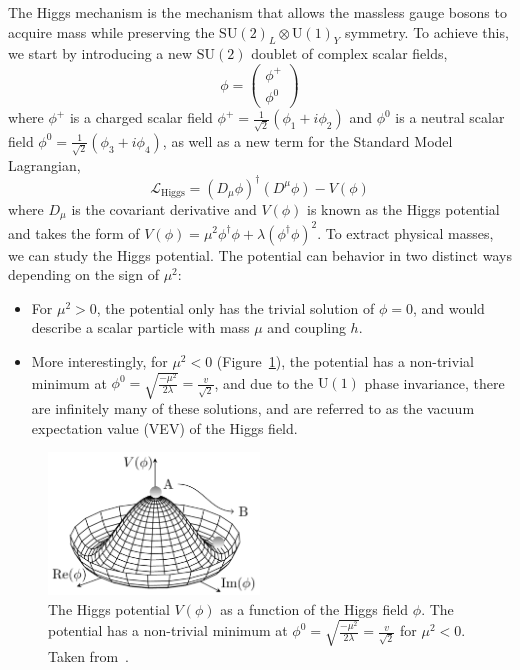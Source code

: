 The Higgs mechanism is the mechanism that allows the massless gauge bosons to acquire mass while preserving the $\mathrm{SU}{(2)}_{L} \otimes \mathrm{U}{(1)}_{Y}$ symmetry. To achieve this, we start by introducing a new $\mathrm{SU}(2)$ doublet of complex scalar fields,
\begin{equation}
  \phi = \begin{pmatrix}
    \phi^{+} \\
    \phi^{0}
  \end{pmatrix}
  \label{eq:higgs_doublet}
\end{equation}
where $\phi^{+}$ is a charged scalar field $\phi^{+} = \frac{1}{\sqrt{2}}(\phi_{1} + i \phi_{2})$ and $\phi^{0}$ is a neutral scalar field $\phi^{0} = \frac{1}{\sqrt{2}}(\phi_{3} + i \phi_{4})$, as well as a new term for the Standard Model Lagrangian,
\begin{equation}
  \mathcal{L}_{\mathrm{Higgs}} = {(D_{\mu}\phi)}^{\dagger}(D^{\mu}\phi) - V(\phi)
  \label{eq:higgs_lagrangian}
\end{equation}
where $D_{\mu}$ is the covariant derivative and $V(\phi)$ is known as the Higgs potential and takes the form of $V(\phi) = \mu^{2}\phi^{\dagger}\phi + \lambda{(\phi^{\dagger}\phi)}^{2}$. To extract physical masses, we can study the Higgs potential. The potential can behavior in two distinct ways depending on the sign of $\mu^{2}$:
\begin{itemize}
  \item For $\mu^{2} > 0$, the potential only has the trivial solution of $\phi = 0$, and would describe a scalar particle with mass $\mu$ and coupling $h$. 
  \item More interestingly, for $\mu^{2} < 0$ (Figure~\ref{fig:theory_higgs_potential}), the potential has a non-trivial minimum at $\phi^{0} = \sqrt{\frac{-\mu^{2}}{2\lambda}} = \frac{v}{\sqrt{2}}$, and due to the $\mathrm{U}(1)$ phase invariance, there are infinitely many of these solutions, and are referred to as the vacuum expectation value (VEV) of the Higgs field.
\end{itemize}

\begin{figure}
  \centering
  \includegraphics[width=0.5\textwidth]{figures/theory/theory_higgs_potential.png}
  \caption{The Higgs potential $V(\phi)$ as a function of the Higgs field $\phi$. The potential has a non-trivial minimum at $\phi^{0} = \sqrt{\frac{-\mu^{2}}{2\lambda}} = \frac{v}{\sqrt{2}}$ for $\mu^{2} < 0$. Taken from~\cite{riebesell_higgs_potential_2022}.}\label{fig:theory_higgs_potential}
\end{figure}

